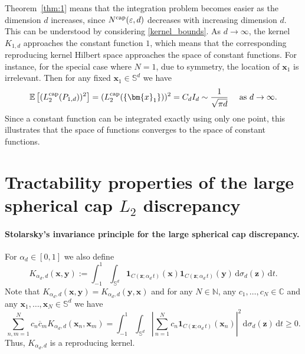 \documentclass[12pt]{article}
\newcommand{\cp}{{\rm cap}}
\begin{document}
Theorem~\ref{thm:1} means that the integration problem becomes easier as the dimension $d$ increases, since $N^{\cp}(\varepsilon, d)$ decreases with increasing dimension $d$. This can be understood by considering \eqref{kernel_bounds}. As $d \rightarrow \infty$, the kernel $K_{1,d}$ approaches the constant function $1$, which means that the corresponding reproducing kernel Hilbert space approaches the space of constant functions. For instance, for the special case where $N = 1$, due to symmetry, the location of $\bm{x}_1$ is irrelevant. Then for any fixed $\bm{x}_1 \in \mathbb{S}^d$ we have
\begin{equation*}
\mathbb{E}\left[(L_2^{\cp}(P_{1,d}))^2 \right] = (L_2^{\cp}(\{\bm{x}_1\}))^2 = C_d I_d \sim \frac{1}{\sqrt{\pi d}} \quad \mbox{ as } d \to \infty.
\end{equation*}
Since a constant function can be integrated exactly using only one point, this illustrates that the space of functions converges to the space of constant functions.




\section{Tractability properties of the large spherical cap $L_2$ discrepancy}\label{sec:tract}

\paragraph{Stolarsky's invariance principle for the large spherical cap discrepancy.}
For $\alpha_d \in [0, 1]$ we also define
\begin{equation*}
K_{\alpha_d,d}(\bm{x}, \bm{y}) := \int_{-1}^1 \int_{\mathbb{S}^d} \bm{1}_{C(\bm{z}; \alpha_d \, t)}(\bm{x}) \bm{1}_{C(\bm{z}; \alpha_d \, t)}(\bm{y}) \,\mathrm{d} \sigma_d(\bm{z}) \,\mathrm{d} t.
\end{equation*}
Note that $K_{\alpha_d,d}(\bm{x}, \bm{y}) = K_{\alpha_d,d}(\bm{y}, \bm{x})$ and for any $N \in \mathbb{N}$, any $c_1,\ldots,c_N \in \mathbb{C}$ and any $\bm{x}_1,\ldots,\bm{x}_N \in \mathbb{S}^d$ we have
\begin{equation*}
\sum_{n,m=1}^N c_n \overline{c}_m K_{\alpha_d,d}(\bm{x}_n, \bm{x}_m) = \int_{-1}^1 \int_{\mathbb{S}^d} \left| \sum_{n=1}^N c_n \bm{1}_{C{(\bm{z}; \alpha_d \, t)}}(\bm{x}_n) \right|^2 \,\mathrm{d} \sigma_d(\bm{z})\,\mathrm{d} t \ge 0.
\end{equation*}
Thus, $K_{\alpha_d,d}$ is a reproducing kernel.
\end{document}
